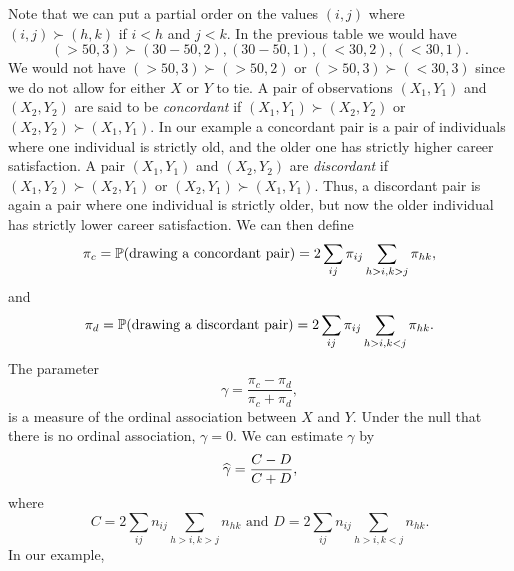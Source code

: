 Note that we can put a partial order on the values $(i,j)$ where $(i,j) \succ (h,k)$ if $i < h$ and $j < k$. In the previous table we would have 
\[(>50,3) \succ (30-50, 2), (30-50, 1), (<30, 2), (<30, 1). \]
We would not have $(>50,3) \succ (>50,2)$ or $(>50,3) \succ (<30,3)$ since we do not allow for either $X$ or $Y$ to tie. A pair of observations $(X_1,Y_1)$ and $(X_2,Y_2)$ are said to be \emph{concordant} if $(X_1,Y_1) \succ (X_2,Y_2)$ or $(X_2, Y_2) \succ (X_1,Y_1)$. In our example a concordant pair is a pair of individuals where one individual is strictly old, and the older one has strictly higher career satisfaction. A pair $(X_1,Y_1)$ and $(X_2,Y_2)$ are \emph{discordant} if $(X_1,Y_2) \succ (X_2, Y_1)$  or $(X_2, Y_1) \succ (X_1,Y_1)$. Thus, a discordant pair is again a pair where one individual is strictly older, but now the older individual has strictly lower career satisfaction. We can then define
\[\pi_c = {\mathbb{P}}(\text{drawing a concordant pair}) = 2\sum_{ij}\pi_{ij} \sum_{h>i,k>j}\pi_{hk},\]
and 
\[\pi_d = {\mathbb{P}}(\text{drawing a discordant pair}) = 2\sum_{ij}\pi_{ij} \sum_{h > i, k<j} \pi_{hk}. \]
The parameter
\[\gamma = \frac{\pi_c-\pi_d}{\pi_c+\pi_d}, \]
is a measure of the ordinal association between $X$ and $Y$. Under the null that there is no ordinal association, $\gamma = 0$. We can estimate $\gamma$ by 
\[\widehat{\gamma} = \frac{C-D}{C+D}, \]
where
\[C = 2\sum_{ij}n_{ij} \sum_{h>i,k>j}n_{hk} \text{ and } D = 2\sum_{ij}n_{ij} \sum_{h > i, k<j} n_{hk}.  \]
In our example,
